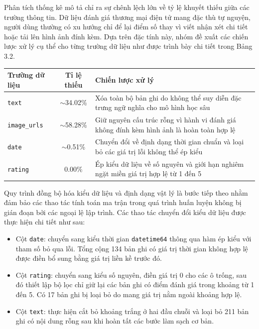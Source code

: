 Phân tích thống kê mô tả chỉ ra sự chênh lệch lớn về tỷ lệ khuyết thiếu giữa các trường thông tin. Dữ liệu đánh giá thương mại điện tử mang đặc thù tự nguyện, người dùng thường có xu hướng chỉ để lại điểm số thay vì viết nhận xét chi tiết hoặc tải lên hình ảnh đính kèm. Dựa trên đặc tính này, nhóm đề xuất các chiến lược xử lý cụ thể cho từng trường dữ liệu như được trình bày chi tiết trong Bảng 3.2.

\begin{center}
\renewcommand{\arraystretch}{1.4}
\begin{tabularx}{\textwidth}{|l|c|X|}
\hline
\rowcolor[HTML]{E8E8E8}
\textbf{Trường dữ liệu} & \textbf{Tỉ lệ thiếu} & \textbf{Chiến lược xử lý} \\
\hline
\texttt{text} & $\sim$34.02\% & Xóa toàn bộ bản ghi do không thể suy diễn đặc trưng ngữ nghĩa cho mô hình học sâu \\
\hline
\texttt{image\_urls} & $\sim$58.28\% & Giữ nguyên cấu trúc rỗng vì hành vi đánh giá không đính kèm hình ảnh là hoàn toàn hợp lệ \\
\hline
\texttt{date} & $\sim$0.51\% & Chuyển đổi về định dạng thời gian chuẩn và loại bỏ các giá trị lỗi không thể ép kiểu \\
\hline
\texttt{rating} & 0.00\% & Ép kiểu dữ liệu về số nguyên và giới hạn nghiêm ngặt miền giá trị hợp lệ từ 1 đến 5 \\
\hline
\end{tabularx}
\end{center}

Quy trình đồng bộ hóa kiểu dữ liệu và định dạng vật lý là bước tiếp theo nhằm đảm bảo các thao tác tính toán ma trận trong quá trình huấn luyện không bị gián đoạn bởi các ngoại lệ lập trình. Các thao tác chuyển đổi kiểu dữ liệu được thực hiện chi tiết như sau:

\begin{itemize}[labelsep=10pt, leftmargin=2cm]
    \item Cột \texttt{date}: chuyển sang kiểu thời gian \texttt{datetime64} thông qua hàm ép kiểu với tham số bỏ qua lỗi. Tổng cộng 134 bản ghi có giá trị thời gian không hợp lệ được điền bổ sung bằng giá trị liền kề trước đó.
    \item Cột \texttt{rating}: chuyển sang kiểu số nguyên, điền giá trị 0 cho các ô trống, sau đó thiết lập bộ lọc chỉ giữ lại các bản ghi có điểm đánh giá trong khoảng từ 1 đến 5. Có 17 bản ghi bị loại bỏ do mang giá trị nằm ngoài khoảng hợp lệ.
    \item Cột \texttt{text}: thực hiện cắt bỏ khoảng trắng ở hai đầu chuỗi và loại bỏ 211 bản ghi có nội dung rỗng sau khi hoàn tất các bước làm sạch cơ bản.
\end{itemize}

